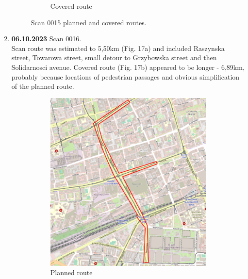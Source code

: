 \documentclass[a4paper,12pt]{book}
\begin{document}
\begin{enumerate}
\begin{figure}[H]
\begin{subfigure}{.85\textwidth}
			\caption{Covered route}
			\label{fig:b15}
		\end{subfigure}
		\caption{Scan 0015 planned and covered routes.}
		\label{fig:fig15}
	\end{figure} 
	\pagebreak
	
	\item \textbf{06.10.2023} Scan 0016. \\
	Scan route was estimated to 5,50km (Fig. 17a) and included Raszynska street, Towarowa street, small detour to Grzybowska street and then Solidarnosci avenue. Covered route (Fig. 17b) appeared to be longer - 6,89km, probably because locations of pedestrian passages and obvious simplification of the planned route. 
	\begin{figure}[H]
		\centering
		\begin{subfigure}{.63\textwidth}
			\centering
			\includegraphics[width=1\linewidth]{route_p16}
			\caption{Planned route}
			\label{fig:a16}
		\end{subfigure}%
		\linebreak
		\begin{subfigure}{.63\textwidth}
			\centering

\end{subfigure}
\end{figure}
\end{enumerate}
\end{document}

